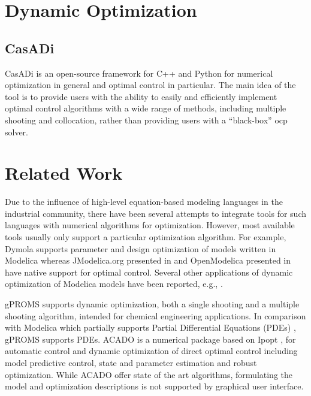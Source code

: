 \section{Dynamic Optimization}
\label{sec:dynamicoptimization}

\subsection{CasADi}
\label{sec:casadi}

CasADi \cite{casadi} is an open-source framework for C++ and Python for numerical optimization in general and optimal control in particular. The main idea of the tool is to provide users with the ability to easily and efficiently implement optimal control algorithms with a wide range of methods, including multiple shooting and collocation, rather than providing users with a “black-box” \acrshort{ocp} solver.

\section{Related Work}
\label{sec:relatedwork}

Due to the influence of high-level equation-based modeling languages in the industrial community, there have been several attempts to integrate tools for such languages with numerical algorithms for optimization. However, most available tools usually only support a particular optimization algorithm. For example, Dymola supports parameter and design optimization of models written in Modelica whereas JModelica.org presented in \cite{akesson} and OpenModelica presented in \cite{bernhard} have native support for optimal control. Several other applications of dynamic optimization of Modelica models have been reported, e.g., \cite{relatedworkjohan,relatedworkfranke, relatedworklarson,relatedworkjan, relatedworkprolss}. 

gPROMS \cite{gproms} supports dynamic optimization, both a single shooting and a multiple shooting algorithm, intended for chemical engineering applications. In comparison with Modelica which partially supports Partial Differential Equations (PDEs) \cite{pdelevon,pdelevonpeter}, gPROMS supports PDEs. ACADO \cite{acado,acadoboris} is a numerical package based on Ipopt \cite{wachter,ipopt}, for automatic control and dynamic optimization of direct optimal control including model predictive control, state and parameter estimation and robust optimization. While ACADO offer state of the art algorithms, formulating the model and optimization descriptions is not supported by graphical user interface. 

